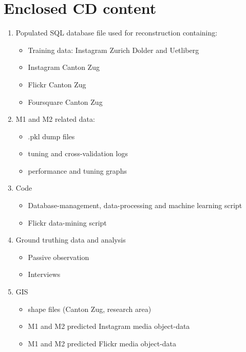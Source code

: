 \chapter*{Enclosed CD content} \label{CD_content}
\begin{enumerate}
    \item Populated SQL database file used for reconstruction containing:
    \begin{itemize}
        \item Training data: Instagram Zurich Dolder and Uetliberg
        \item Instagram Canton Zug
        \item Flickr Canton Zug
        \item Foursquare Canton Zug
    \end{itemize}
    \item M1 and M2 related data:
    \begin{itemize}
        \item .pkl dump files
        \item tuning and cross-validation logs
        \item performance and tuning graphs
    \end{itemize}
    \item Code
    \begin{itemize}
        \item Database-management, data-processing and machine learning script
        \item Flickr data-mining script
    \end{itemize}
    \item Ground truthing data and analysis
    \begin{itemize}
        \item Passive observation
        \item Interviews
    \end{itemize}
    \item GIS
    \begin{itemize}
        \item shape files (Canton Zug, research area)
        \item M1 and M2 predicted Instagram media object-data
        \item M1 and M2 predicted Flickr media object-data
    \end{itemize}
\end{enumerate}